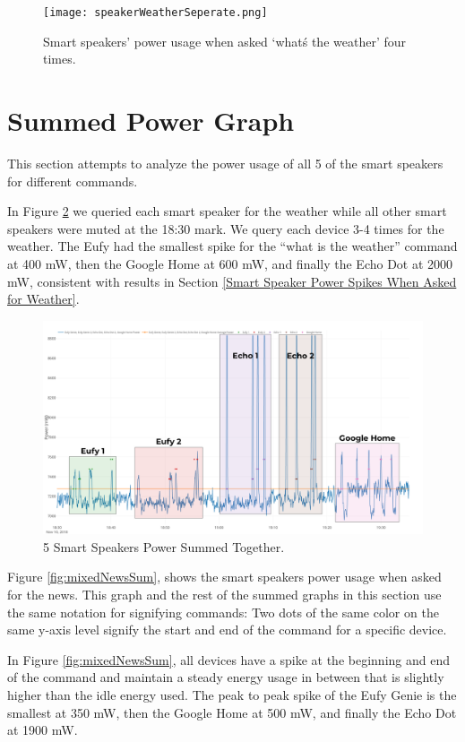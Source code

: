 \begin{figure}[H]
    \centering
    \texttt{[image: speakerWeatherSeperate.png]}
    \caption{Smart speakers' power usage when asked `what\'s the weather' four times.}
    \label{fig:speakerWeatherSeperate}
\end{figure}

\section{Summed Power Graph}
\label{sumPowerGraph}
This section attempts to analyze the power usage of all 5 of the smart speakers for different commands.

In Figure \ref{fig:weatherSum} we queried each smart speaker for the weather while all other smart speakers were muted at the 18:30 mark. We query each device 3-4 times for the weather. The Eufy had the smallest spike for the ``what is the weather'' command at 400 mW, then the Google Home at 600 mW, and finally the Echo Dot at 2000 mW, consistent with results in Section \ref{Smart Speaker Power Spikes When Asked for Weather}.

\begin{figure}[H]
  \centering
  \includegraphics[width=1\textwidth]{figures/weatherSum.png}
  \caption{5 Smart Speakers Power Summed Together.}
  \label{fig:weatherSum}
\end{figure}

Figure \ref{fig:mixedNewsSum}, shows the smart speakers power usage when asked for the news. This graph and the rest of the summed graphs in this section use the same notation for signifying commands: Two dots of the same color on the same y-axis level signify the start and end of the command for a specific device.

In Figure \ref{fig:mixedNewsSum}, all devices have a spike at the beginning and end of the command and maintain a steady energy usage in between that is slightly higher than the idle energy used. The peak to peak spike of the Eufy Genie is the smallest at 350 mW, then the Google Home at 500 mW, and finally the Echo Dot at 1900 mW.

